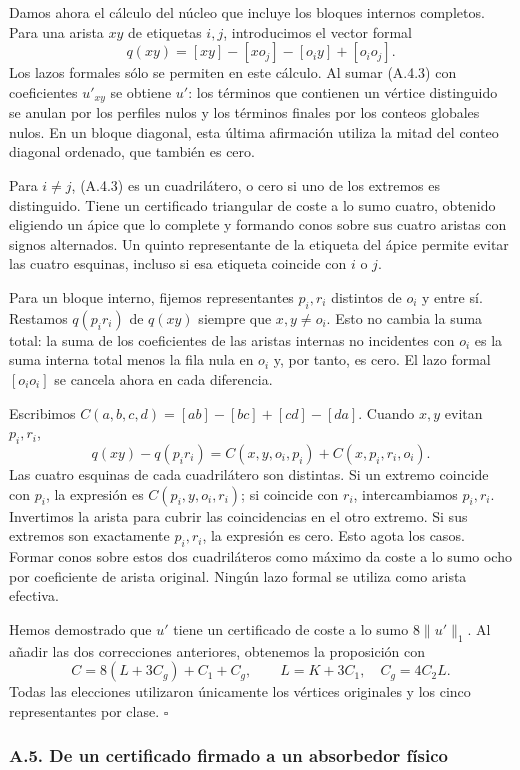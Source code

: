\documentclass[spanish,11pt,a4paper]{article}
\begin{document}
Damos ahora el cálculo del núcleo que incluye los bloques internos completos. Para una arista \(xy\) de etiquetas \(i,j\), introducimos el vector formal \[q(xy)=[xy]-[x o_j]-[o_i y]+[o_i o_j].
\tag{A.4.3}\] Los lazos formales sólo se permiten en este cálculo. Al sumar (A.4.3) con coeficientes \(u'_{xy}\) se obtiene \(u'\): los términos que contienen un vértice distinguido se anulan por los perfiles nulos y los términos finales por los conteos globales nulos. En un bloque diagonal, esta última afirmación utiliza la mitad del conteo diagonal ordenado, que también es cero.

Para \(i\ne j\), (A.4.3) es un cuadrilátero, o cero si uno de los extremos es distinguido. Tiene un certificado triangular de coste a lo sumo cuatro, obtenido eligiendo un ápice que lo complete y formando conos sobre sus cuatro aristas con signos alternados. Un quinto representante de la etiqueta del ápice permite evitar las cuatro esquinas, incluso si esa etiqueta coincide con \(i\) o \(j\).

Para un bloque interno, fijemos representantes \(p_i,r_i\) distintos de \(o_i\) y entre sí. Restamos \(q(p_ir_i)\) de \(q(xy)\) siempre que \(x,y\ne o_i\). Esto no cambia la suma total: la suma de los coeficientes de las aristas internas no incidentes con \(o_i\) es la suma interna total menos la fila nula en \(o_i\) y, por tanto, es cero. El lazo formal \([o_io_i]\) se cancela ahora en cada diferencia.

Escribimos \(C(a,b,c,d)=[ab]-[bc]+[cd]-[da]\). Cuando \(x,y\) evitan \(p_i,r_i\), \[q(xy)-q(p_ir_i)
=C(x,y,o_i,p_i)+C(x,p_i,r_i,o_i).
\tag{A.4.4}\] Las cuatro esquinas de cada cuadrilátero son distintas. Si un extremo coincide con \(p_i\), la expresión es \(C(p_i,y,o_i,r_i)\); si coincide con \(r_i\), intercambiamos \(p_i,r_i\). Invertimos la arista para cubrir las coincidencias en el otro extremo. Si sus extremos son exactamente \(p_i,r_i\), la expresión es cero. Esto agota los casos. Formar conos sobre estos dos cuadriláteros como máximo da coste a lo sumo ocho por coeficiente de arista original. Ningún lazo formal se utiliza como arista efectiva.

Hemos demostrado que \(u'\) tiene un certificado de coste a lo sumo \(8\|u'\|_1\). Al añadir las dos correcciones anteriores, obtenemos la proposición con \[C=8(L+3C_g)+C_1+C_g,
\qquad L=K+3C_1,\quad C_g=4C_2L.
\tag{A.4.5}\] Todas las elecciones utilizaron únicamente los vértices originales y los cinco representantes por clase. \(\square\)

\subsubsection{A.5. De un certificado firmado a un absorbedor físico}\label{a.5.-de-un-certificado-firmado-a-un-absorbedor-fuxedsico}
\end{document}
